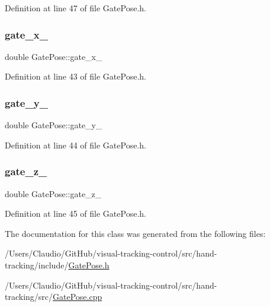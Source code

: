 Definition at line 47 of file Gate\+Pose.\+h.

\mbox{\label{classGatePose_a702b2c10eb1d86b9a0ac139b3f894310}} 
\subsubsection{\texorpdfstring{gate\+\_\+x\+\_\+}{gate\_x\_}}
{\footnotesize\ttfamily double Gate\+Pose\+::gate\+\_\+x\+\_\+\hspace{0.3cm}{\ttfamily [private]}}



Definition at line 43 of file Gate\+Pose.\+h.

\mbox{\label{classGatePose_a844864ec9133c4c2081b3682ca243cac}} 
\subsubsection{\texorpdfstring{gate\+\_\+y\+\_\+}{gate\_y\_}}
{\footnotesize\ttfamily double Gate\+Pose\+::gate\+\_\+y\+\_\+\hspace{0.3cm}{\ttfamily [private]}}



Definition at line 44 of file Gate\+Pose.\+h.

\mbox{\label{classGatePose_a1ff2edfa464cfe7efc8c1da43f59de21}} 
\subsubsection{\texorpdfstring{gate\+\_\+z\+\_\+}{gate\_z\_}}
{\footnotesize\ttfamily double Gate\+Pose\+::gate\+\_\+z\+\_\+\hspace{0.3cm}{\ttfamily [private]}}



Definition at line 45 of file Gate\+Pose.\+h.



The documentation for this class was generated from the following files\+:\begin{DoxyCompactItemize}
\item 
/\+Users/\+Claudio/\+Git\+Hub/visual-\/tracking-\/control/src/hand-\/tracking/include/\hyperlink{GatePose_8h}{Gate\+Pose.\+h}\item 
/\+Users/\+Claudio/\+Git\+Hub/visual-\/tracking-\/control/src/hand-\/tracking/src/\hyperlink{GatePose_8cpp}{Gate\+Pose.\+cpp}\end{DoxyCompactItemize}
